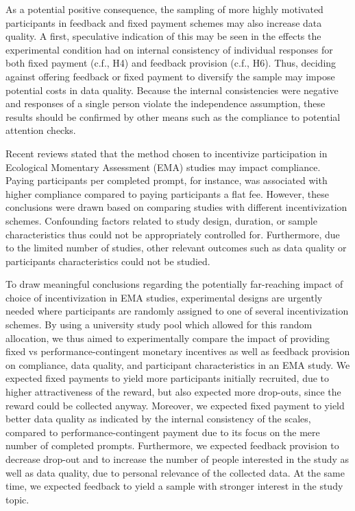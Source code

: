 \documentclass[authordate, empirical,issue]{jote-new-article}
\begin{document}
	As a potential positive consequence, the sampling of more highly motivated participants in feedback and fixed payment schemes may also increase data quality. A first, speculative indication of this may be seen in the effects the experimental condition had on internal consistency of individual responses for both fixed payment (c.f., H4) and feedback provision (c.f., H6). Thus, deciding against offering feedback or fixed payment to diversify the sample may impose potential costs in data quality. Because the internal consistencies were negative and responses of a single person violate the independence assumption, these results should be confirmed by other means such as the compliance to potential attention checks.

	\begin{originalPurpose}




		Recent reviews stated that the method chosen to incentivize participation in Ecological Momentary Assessment (EMA) studies may impact compliance. Paying participants per completed prompt, for instance, was associated with higher compliance compared to paying participants a flat fee. However, these conclusions were drawn based on comparing studies with different incentivization schemes. Confounding factors related to study design, duration, or sample characteristics thus could not be appropriately controlled for. Furthermore, due to the limited number of studies, other relevant outcomes such as data quality or participants characteristics could not be studied.
		
		To draw meaningful conclusions regarding the potentially far-reaching impact of choice of incentivization in EMA studies, experimental designs are urgently needed where participants are randomly assigned to one of several incentivization schemes. By using a university study pool which allowed for this random allocation, we thus aimed to experimentally compare the impact of providing fixed vs performance-contingent monetary incentives as well as feedback provision on compliance, data quality, and participant characteristics in an EMA study. We expected fixed payments to yield more participants initially recruited, due to higher attractiveness of the reward, but also expected more drop-outs, since the reward could be collected anyway. Moreover, we expected fixed payment to yield better data quality as indicated by the internal consistency of the scales, compared to performance-contingent payment due to its focus on the mere number of completed prompts. Furthermore, we expected feedback provision to decrease drop-out and to increase the number of people interested in the study as well as data quality, due to personal relevance of the collected data. At the same time, we expected feedback to yield a sample with stronger interest in the study topic.
	\end{originalPurpose}
\end{document}
